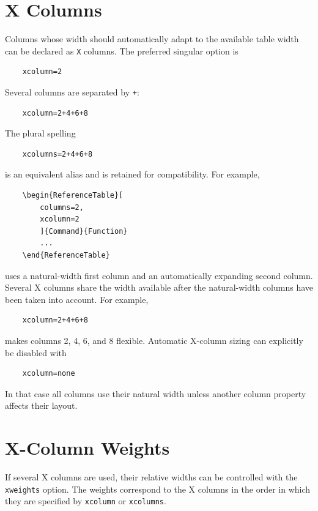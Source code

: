 \documentclass[
11pt,
a4paper,
oneside
]{scrbook}
\begin{document}
{%
\section{X Columns}

Columns whose width should automatically adapt to the available table width
can be declared as \texttt{X} columns.
The preferred singular option is

\begin{verbatim}
	xcolumn=2
\end{verbatim}
Several columns are separated by \texttt{+}:
\begin{verbatim}
	xcolumn=2+4+6+8
\end{verbatim}
The plural spelling
\begin{verbatim}
	xcolumns=2+4+6+8
\end{verbatim}
is an equivalent alias and is retained for compatibility.
For example,
\begin{verbatim}
	\begin{ReferenceTable}[
		columns=2,
		xcolumn=2
		]{Command}{Function}
		...
	\end{ReferenceTable}
\end{verbatim}
uses a natural-width first column and an automatically expanding second
column.
Several X columns share the width available after the natural-width columns
have been taken into account. For example,
\begin{verbatim}
	xcolumn=2+4+6+8
\end{verbatim}
makes columns 2, 4, 6, and 8 flexible.
Automatic X-column sizing can explicitly be disabled with
\begin{verbatim}
	xcolumn=none
\end{verbatim}
In that case all columns use their natural width unless another column
property affects their layout.

\section{X-Column Weights}

If several X columns are used, their relative widths can be controlled with
the \texttt{xweights} option. The weights correspond to the X columns in the
order in which they are specified by \texttt{xcolumn} or \texttt{xcolumns}.

}
\end{document}
